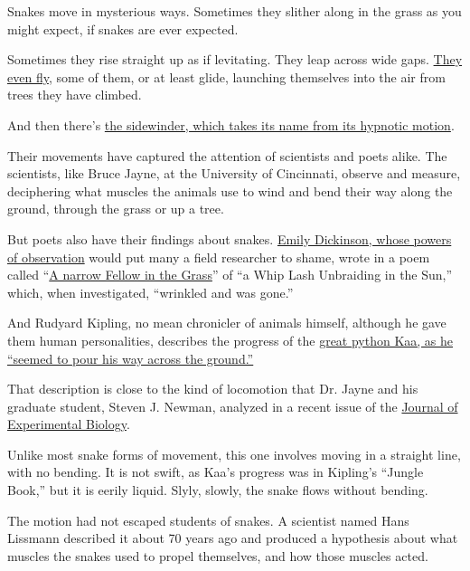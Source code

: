 Snakes move in mysterious ways. Sometimes they slither along in the
grass as you might expect, if snakes are ever expected.

Sometimes they rise straight up as if levitating. They leap across wide
gaps.
\href{https://www.nytimes3xbfgragh.onion/video/science/100000002721454/sciencetake-flying-snakes.html}{They
even fly}, some of them, or at least glide, launching themselves into
the air from trees they have climbed.

And then there's
\href{https://www.nytimes3xbfgragh.onion/2014/10/09/science/secrets-of-the-sidewinder.html}{the
sidewinder, which takes its name from its hypnotic motion}.

Their movements have captured the attention of scientists and poets
alike. The scientists, like Bruce Jayne, at the University of
Cincinnati, observe and measure, deciphering what muscles the animals
use to wind and bend their way along the ground, through the grass or up
a tree.

But poets also have their findings about snakes.
\href{https://www.nytimes3xbfgragh.onion/2016/05/17/science/emily-dickinson-lost-gardens.html}{Emily
Dickinson, whose powers of observation} would put many a field
researcher to shame, wrote in a poem called
``\href{https://www.poetryfoundation.org/poems/49909/a-narrow-fellow-in-the-grass-1096}{A
narrow Fellow in the Grass}'' of ``a Whip Lash Unbraiding in the Sun,''
which, when investigated, ``wrinkled and was gone.''

And Rudyard Kipling, no mean chronicler of animals himself, although he
gave them human personalities, describes the progress of the
\href{https://www.cs.cmu.edu/~rgs/jngl-Hunting.html}{great python Kaa,
as he ``seemed to pour his way across the ground.''}

That description is close to the kind of locomotion that Dr. Jayne and
his graduate student, Steven J. Newman, analyzed in a recent issue of
the
\href{http://jeb.biologists.org/content/early/2017/12/05/jeb.166199}{Journal
of Experimental Biology}.

Unlike most snake forms of movement, this one involves moving in a
straight line, with no bending. It is not swift, as Kaa's progress was
in Kipling's ``Jungle Book,'' but it is eerily liquid. Slyly, slowly,
the snake flows without bending.

The motion had not escaped students of snakes. A scientist named Hans
Lissmann described it about 70 years ago and produced a hypothesis about
what muscles the snakes used to propel themselves, and how those muscles
acted.

